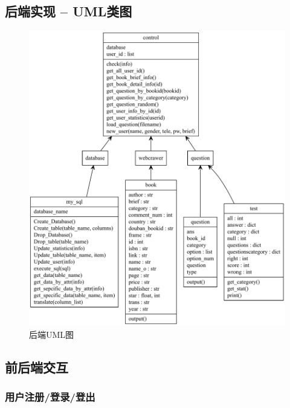 \documentclass[twoside,11pt]{article}
\begin{document}
\subsection{后端实现 -- UML类图}
\begin{figure}[htbp]
    \includegraphics[width=1\columnwidth]{figures/backenduml.pdf}
    \caption{后端UML图}
    \label{fig:backenduml}
\end{figure}
\subsection{前后端交互}

\subsubsection{用户注册/登录/登出}
\end{document}
